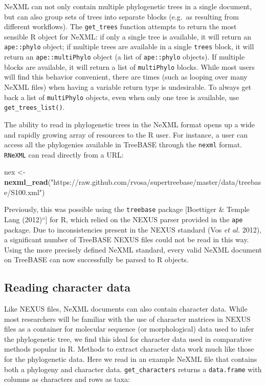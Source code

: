 \documentclass[author-year, review, 11pt]{components/elsarticle} %
\newenvironment{Shaded}{\begin{snugshade}}{\end{snugshade}}
\newcommand{\KeywordTok}[1]{\textcolor[rgb]{0.13,0.29,0.53}{\textbf{{#1}}}}
\newcommand{\StringTok}[1]{\textcolor[rgb]{0.31,0.60,0.02}{{#1}}}
\newcommand{\NormalTok}[1]{{#1}}
\begin{document}
NeXML can not only contain multiple phylogenetic trees in a single
document, but can also group sets of trees into separate blocks (e.g.~as
resulting from different workflows). The \texttt{get\_trees} function
attempts to return the most sensible R object for NeXML: if only a
single tree is available, it will return an \texttt{ape::phylo} object;
if multiple trees are available in a single \texttt{trees} block, it
will return an \texttt{ape::multiPhylo} object (a list of
\texttt{ape::phylo} objects). If multiple blocks are available, it will
return a list of \texttt{multiPhylo} blocks. While most users will find
this behavior convenient, there are times (such as looping over many
NeXML files) when having a variable return type is undesirable. To
always get back a list of \texttt{multiPhylo} objects, even when only
one tree is available, use \texttt{get\_trees\_list()}.

The ability to read in phylogenetic trees in the NeXML format opens up a
wide and rapidly growing array of resources to the R user. For instance,
a user can access all the phylogenies available in TreeBASE through the
\texttt{nexml} format. \texttt{RNeXML} can read directly from a URL:

\begin{Shaded}
\begin{Highlighting}[]
\NormalTok{nex <-}\StringTok{ }\KeywordTok{nexml_read}\NormalTok{(}\StringTok{"https://raw.github.com/rvosa/supertreebase/master/data/treebase/S100.xml"}\NormalTok{)}
\end{Highlighting}
\end{Shaded}

Previously, this was possible using the \texttt{treebase} package
{[}Boettiger \& {Temple Lang} (2012)``{]} for R, which relied on the
NEXUS parser provided in the \texttt{ape} package. Due to
inconsistencies present in the NEXUS standard (Vos \emph{et al.} 2012),
a significant number of TreeBASE NEXUS files could not be read in this
way. Using the more precisely defined NeXML standard, every valid NeXML
document on TreeBASE can now successfully be parsed to R objects.

\subsection{Reading character data}\label{reading-character-data}

Like NEXUS files, NeXML documents can also contain character data. While
most researchers will be familiar with the use of character matrices in
NEXUS files as a container for molecular sequence (or morphological)
data used to infer the phylogenetic tree, we find this ideal for
character data used in comparative methods popular in R. Methods to
extract character data work much like those for the phylogenetic data.
Here we read in an example NeXML file that contains both a phylogeny and
character data. \texttt{get\_characters} returns a \texttt{data.frame}
with columns as characters and rows as taxa:
\end{document}
